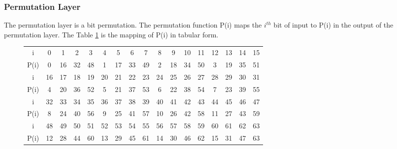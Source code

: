 \documentclass[preprint]{transcrypto}
\begin{document}
\subsubsection{Permutation Layer} 
The permutation layer is a bit permutation. The permutation function P(i) maps the $i^{th}$ bit of input to P(i) in the output of the permutation layer. The Table {\ref{tab:pLayer}} is the mapping of P(i) in tabular form. 
\begin{figure}[h!]
    \centering
    \begin{tabular}{ |c||c|c|c|c|c|c|c|c|c|c|c|c|c|c|c|c| }
        \hline
        i& 0 &1 &2 &3& 4& 5& 6 &7 &8 &9 &10 &11 &12 &13 &14 &15 \\
        P(i) &0& 16& 32& 48& 1& 17& 33&49& 2 &18& 34& 50& 3 &19 &35 &51 \\\hline\hline
        i &16& 17& 18& 19& 20& 21 &22& 23 &24 &25 &26 &27 &28 &29 &30 &31 \\
        P(i)& 4 &20 &36& 52& 5& 21 &37& 53& 6 &22& 38& 54& 7 &23 &39 &55 \\\hline\hline
        i &32& 33& 34& 35& 36& 37 &38& 39 &40 &41 &42 &43 &44 &45 &46 &47 \\
        P(i) &8 &24& 40& 56 &9& 25 &41 &57 &10 &26 &42 &58 &11 &27 &43 &59 \\\hline\hline
        i &48& 49& 50 &51 &52 &53& 54& 55 &56 &57 &58 &59 &60 &61 &62 &63 \\
        P(i) &12& 28& 44&60& 13 &29& 45& 61 &14 &30 &46 &62 &15 &31 &47 &63 \\\hline
    \end{tabular}
    \label{tab:pLayer}
\end{figure}
\end{document}
